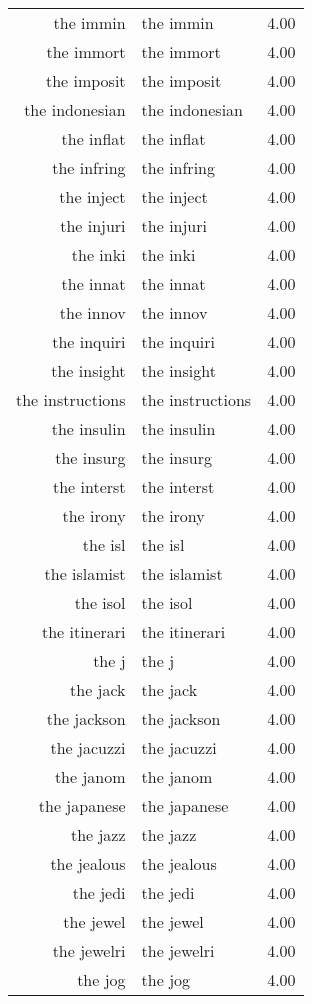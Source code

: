\begin{table}[ht]
\begin{tabular}{rlr}
  the immin & the immin & 4.00 \\ 
  the immort & the immort & 4.00 \\ 
  the imposit & the imposit & 4.00 \\ 
  the indonesian & the indonesian & 4.00 \\ 
  the inflat & the inflat & 4.00 \\ 
  the infring & the infring & 4.00 \\ 
  the inject & the inject & 4.00 \\ 
  the injuri & the injuri & 4.00 \\ 
  the inki & the inki & 4.00 \\ 
  the innat & the innat & 4.00 \\ 
  the innov & the innov & 4.00 \\ 
  the inquiri & the inquiri & 4.00 \\ 
  the insight & the insight & 4.00 \\ 
  the instructions & the instructions & 4.00 \\ 
  the insulin & the insulin & 4.00 \\ 
  the insurg & the insurg & 4.00 \\ 
  the interst & the interst & 4.00 \\ 
  the irony & the irony & 4.00 \\ 
  the isl & the isl & 4.00 \\ 
  the islamist & the islamist & 4.00 \\ 
  the isol & the isol & 4.00 \\ 
  the itinerari & the itinerari & 4.00 \\ 
  the j & the j & 4.00 \\ 
  the jack & the jack & 4.00 \\ 
  the jackson & the jackson & 4.00 \\ 
  the jacuzzi & the jacuzzi & 4.00 \\ 
  the janom & the janom & 4.00 \\ 
  the japanese & the japanese & 4.00 \\ 
  the jazz & the jazz & 4.00 \\ 
  the jealous & the jealous & 4.00 \\ 
  the jedi & the jedi & 4.00 \\ 
  the jewel & the jewel & 4.00 \\ 
  the jewelri & the jewelri & 4.00 \\ 
  the jog & the jog & 4.00 \\ 

\end{tabular}
\end{table}
